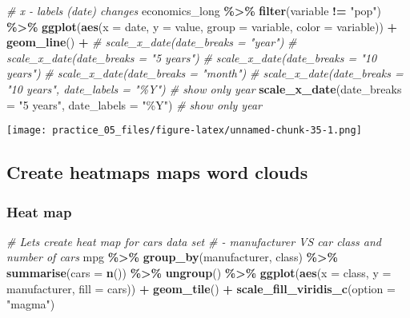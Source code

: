 \documentclass[
]{article}
\newenvironment{Shaded}{\begin{snugshade}}{\end{snugshade}}
\newcommand{\AttributeTok}[1]{\textcolor[rgb]{0.13,0.29,0.53}{#1}}
\newcommand{\CommentTok}[1]{\textcolor[rgb]{0.56,0.35,0.01}{\textit{#1}}}
\newcommand{\FunctionTok}[1]{\textcolor[rgb]{0.13,0.29,0.53}{\textbf{#1}}}
\newcommand{\NormalTok}[1]{#1}
\newcommand{\SpecialCharTok}[1]{\textcolor[rgb]{0.81,0.36,0.00}{\textbf{#1}}}
\newcommand{\StringTok}[1]{\textcolor[rgb]{0.31,0.60,0.02}{#1}}
\begin{document}
\begin{Shaded}
\begin{Highlighting}[]
\CommentTok{\# x {-} labels (date) changes}
\NormalTok{economics\_long }\SpecialCharTok{\%\textgreater{}\%} 
  \FunctionTok{filter}\NormalTok{(variable }\SpecialCharTok{!=} \StringTok{"pop"}\NormalTok{) }\SpecialCharTok{\%\textgreater{}\%} 
  \FunctionTok{ggplot}\NormalTok{(}\FunctionTok{aes}\NormalTok{(}\AttributeTok{x =}\NormalTok{ date,}
             \AttributeTok{y =}\NormalTok{ value,}
             \AttributeTok{group =}\NormalTok{ variable,}
             \AttributeTok{color =}\NormalTok{ variable)) }\SpecialCharTok{+}
  \FunctionTok{geom\_line}\NormalTok{() }\SpecialCharTok{+}
  \CommentTok{\# scale\_x\_date(date\_breaks = "year")}
  \CommentTok{\# scale\_x\_date(date\_breaks = "5 years")}
  \CommentTok{\# scale\_x\_date(date\_breaks = "10 years")}
  \CommentTok{\# scale\_x\_date(date\_breaks = "month")}
  \CommentTok{\# scale\_x\_date(date\_breaks = "10 years", date\_labels = "\%Y") \# show only year}
  \FunctionTok{scale\_x\_date}\NormalTok{(}\AttributeTok{date\_breaks =} \StringTok{"5 years"}\NormalTok{, }\AttributeTok{date\_labels =} \StringTok{"\%Y"}\NormalTok{) }\CommentTok{\# show only year}
\end{Highlighting}
\end{Shaded}

\texttt{[image: practice\_05\_files/figure-latex/unnamed-chunk-35-1.png]}

\subsection{Create heatmaps maps word
clouds}\label{create-heatmaps-maps-word-clouds}

\subsubsection{Heat map}\label{heat-map}

\begin{Shaded}
\begin{Highlighting}[]
\CommentTok{\#   Let\textquotesingle{}s create heat map for cars data set}
\CommentTok{\#   {-} manufacturer VS car class and number of cars}
\NormalTok{mpg }\SpecialCharTok{\%\textgreater{}\%} 
  \FunctionTok{group\_by}\NormalTok{(manufacturer, class) }\SpecialCharTok{\%\textgreater{}\%} 
  \FunctionTok{summarise}\NormalTok{(}\AttributeTok{cars =} \FunctionTok{n}\NormalTok{()) }\SpecialCharTok{\%\textgreater{}\%} 
  \FunctionTok{ungroup}\NormalTok{() }\SpecialCharTok{\%\textgreater{}\%} 
  \FunctionTok{ggplot}\NormalTok{(}\FunctionTok{aes}\NormalTok{(}\AttributeTok{x =}\NormalTok{ class,}
             \AttributeTok{y =}\NormalTok{ manufacturer,}
             \AttributeTok{fill =}\NormalTok{ cars)) }\SpecialCharTok{+}
  \FunctionTok{geom\_tile}\NormalTok{() }\SpecialCharTok{+}
  \FunctionTok{scale\_fill\_viridis\_c}\NormalTok{(}\AttributeTok{option =} \StringTok{"magma"}\NormalTok{)}
\end{Highlighting}
\end{Shaded}
\end{document}
